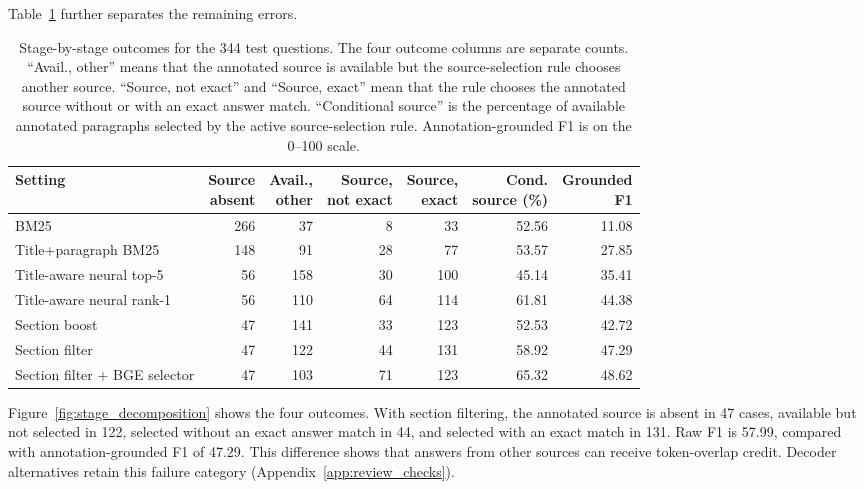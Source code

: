 \documentclass[pdflatex,sn-basic]{sn-jnl}%
\theoremstyle{thmstyleone}%
\theoremstyle{thmstyletwo}%
\theoremstyle{thmstylethree}%
\begin{document}
Table~\ref{tab:stage_decomposition} further separates the remaining errors.

\begin{table}[!htbp]
    \caption{Stage-by-stage outcomes for the 344 test questions. The four
    outcome columns are separate counts. ``Avail., other'' means that the
    annotated source is available but the source-selection rule chooses
    another source. ``Source, not exact'' and ``Source, exact'' mean that the
    rule chooses the annotated source without or with an exact answer match.
    ``Conditional source'' is the percentage of available annotated
    paragraphs selected by the active source-selection rule.
    Annotation-grounded F1 is on the 0--100 scale.}
    \label{tab:stage_decomposition}
    \centering
    \scriptsize
    \setlength{\tabcolsep}{3pt}
    \begin{tabular}{@{}lrrrrrr@{}}
        \toprule
        Setting & \shortstack{Source\\absent} &
        \shortstack{Avail.,\\other} &
        \shortstack{Source,\\not exact} &
        \shortstack{Source,\\exact} &
        \shortstack{Cond.\\source (\%)} &
        \shortstack{Grounded\\F1} \\
        \midrule
        BM25 & 266 & 37 & 8 & 33 & 52.56 & 11.08 \\
        Title+paragraph BM25 & 148 & 91 & 28 & 77 & 53.57 & 27.85 \\
        Title-aware neural top-5 & 56 & 158 & 30 & 100 & 45.14 & 35.41 \\
        Title-aware neural rank-1 & 56 & 110 & 64 & 114 & 61.81 & 44.38 \\
        Section boost & 47 & 141 & 33 & 123 & 52.53 & 42.72 \\
        Section filter & 47 & 122 & 44 & 131 & 58.92 & 47.29 \\
        Section filter + BGE selector & 47 & 103 & 71 & 123 & 65.32 & 48.62 \\
        \bottomrule
    \end{tabular}
\end{table}
\FloatBarrier

Figure~\ref{fig:stage_decomposition} shows the four outcomes. With section
filtering, the annotated source is absent in 47 cases, available but not
selected in 122, selected without an exact answer match in 44, and selected
with an exact match in 131. Raw F1 is 57.99, compared with
annotation-grounded F1 of 47.29. This difference shows that answers from
other sources can receive token-overlap credit. Decoder alternatives retain
this failure category (Appendix~\ref{app:review_checks}).
\end{document}
